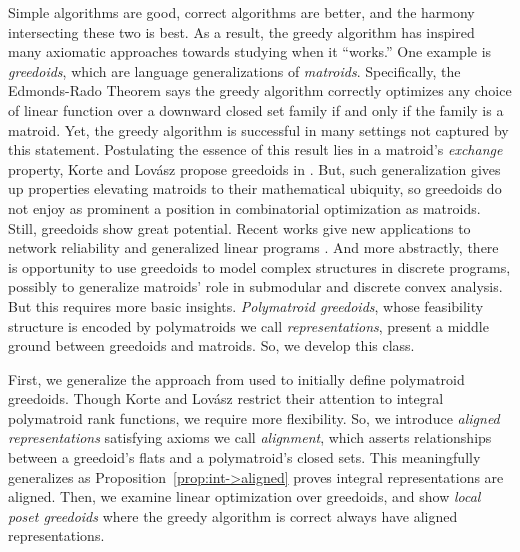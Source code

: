 \documentclass[11pt]{article}
\begin{document}
Simple algorithms are good, correct algorithms are better, and the harmony intersecting these two is best.
As a result, the greedy algorithm has inspired many axiomatic approaches towards studying when it ``works.'' 
One example is \emph{greedoids},  which are language generalizations of \emph{matroids}.
Specifically, the Edmonds-Rado Theorem \cite{edmonds1971matroids,rado1957note} says the greedy algorithm correctly optimizes any choice of linear function over a downward closed set family if and only if the family is a matroid.
Yet, the greedy algorithm is successful in many settings not captured by this statement.
Postulating the essence of this result lies in a matroid's \emph{exchange} property, Korte and Lovász propose greedoids in \cite{korte1984structural}.
But, such generalization gives up properties elevating matroids to their mathematical ubiquity, so greedoids do not enjoy as prominent a position in combinatorial optimization as matroids.
Still, greedoids show great potential.
Recent works give new applications to network reliability \cite{szeszler2021new} and generalized linear programs \cite{kempner2024greedoids}.
And more abstractly, there is opportunity to use greedoids to model complex structures in discrete programs, possibly to generalize matroids' role in submodular and discrete convex analysis.
But this requires more basic insights.
\emph{Polymatroid greedoids}, whose feasibility structure is encoded by polymatroids we call \emph{representations}, present a middle ground between greedoids and matroids.
So, we develop this class.

First, we generalize the approach from \cite{korte1985polymatroid} used to initially define polymatroid greedoids.
Though Korte and Lovász restrict their attention to integral polymatroid rank functions, we require more flexibility.
So, we introduce \emph{aligned representations} satisfying axioms we call \emph{alignment}, which asserts relationships between a greedoid's flats and a polymatroid's closed sets.
This meaningfully generalizes \cite{korte1985polymatroid} as 
Proposition~\ref{prop:int->aligned} proves integral representations are aligned.
Then, we examine linear optimization over greedoids, and show \emph{local poset greedoids} where the greedy algorithm is correct always have aligned representations.

\end{document}
